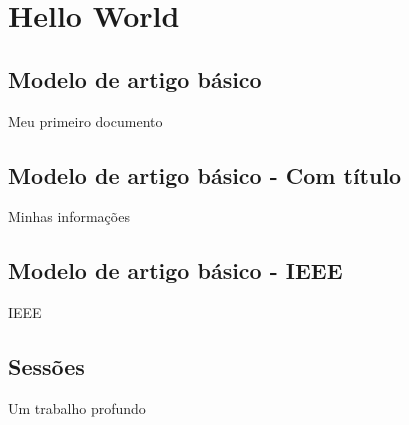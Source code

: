 \section{Hello World}

\subsection*{Modelo de artigo básico}
\begin{frame}{Meu primeiro documento}
\begin{CenteredBox}
	
\end{CenteredBox}
\end{frame}

\subsection*{Modelo de artigo básico - Com título}
\begin{frame}{Minhas informações}
\begin{CenteredBox}
	
\end{CenteredBox}
\end{frame}

\subsection*{Modelo de artigo básico - IEEE}
\begin{frame}{IEEE}
\begin{CenteredBox}
	
\end{CenteredBox}
\end{frame}

\subsection*{Sessões} %
\label{sub:sess_es}
\begin{frame}{Um trabalho profundo}
\begin{CenteredBox}
	
\end{CenteredBox}
\end{frame}

